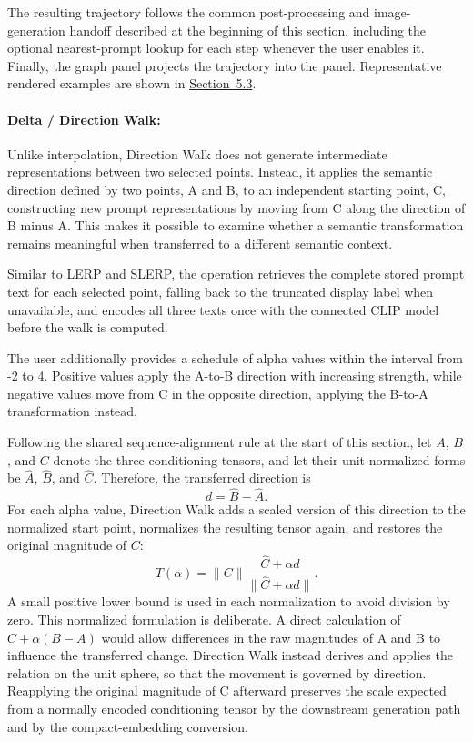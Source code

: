 The resulting trajectory follows the common post-processing and image-generation handoff described at the beginning of this section, including the optional nearest-prompt lookup for each step whenever the user enables it. Finally, the graph panel projects the trajectory into the panel. Representative rendered examples are shown in \hyperref[sec:5.3]{Section~5.3}.

\paragraph{Delta / Direction Walk:} Unlike interpolation, Direction Walk does not generate intermediate representations between two selected points. Instead, it applies the semantic direction defined by two points, A and B, to an independent starting point, C, constructing new prompt representations by moving from C along the direction of B minus A. This makes it possible to examine whether a semantic transformation remains meaningful when transferred to a different semantic context.

Similar to LERP and SLERP, the operation retrieves the complete stored prompt text for each selected point, falling back to the truncated display label when unavailable, and encodes all three texts once with the connected CLIP model before the walk is computed.

The user additionally provides a schedule of alpha values within the interval from -2 to 4. Positive values apply the A-to-B direction with increasing strength, while negative values move from C in the opposite direction, applying the B-to-A transformation instead.

Following the shared sequence-alignment rule at the start of this section, let $A$, $B$, and $C$ denote the three conditioning tensors, and let their unit-normalized forms be $\hat{A}$, $\hat{B}$, and $\hat{C}$. Therefore, the transferred direction is
\[
d = \hat{B} - \hat{A}.
\]
For each alpha value, Direction Walk adds a scaled version of this direction to the normalized start point, normalizes the resulting tensor again, and restores the original magnitude of $C$:
\[
T(\alpha) = \lVert C \rVert
\frac{\hat{C} + \alpha d}
{\lVert \hat{C} + \alpha d \rVert}.
\]
A small positive lower bound is used in each normalization to avoid division by zero. This normalized formulation is deliberate. A direct calculation of $C + \alpha(B - A)$ would allow differences in the raw magnitudes of A and B to influence the transferred change. Direction Walk instead derives and applies the relation on the unit sphere, so that the movement is governed by direction. Reapplying the original magnitude of C afterward preserves the scale expected from a normally encoded conditioning tensor by the downstream generation path and by the compact-embedding conversion.

